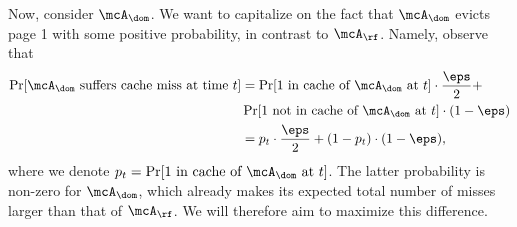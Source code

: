 \documentclass[11pt]{article}
\begin{document}
Now, consider $\mcA_{\dom}$. We want to capitalize on the fact that $\mcA_\dom$ evicts page 1 with some positive probability, in contrast to $\mcA_\rf$. Namely, observe that 
\begin{align}
    \Pr[\text{$\mcA_\dom$ suffers cache miss at time $t$}] &= \Pr[\text{$1$ in cache of $\mcA_\dom$ at $t$}] \cdot \frac{\eps}{2} + \nonumber\\
    & \Pr[\text{$1$ not in cache of $\mcA_\dom$ at $t$}] \cdot (1-\eps) \nonumber \\
    &= p_t \cdot \frac{\eps}{2} + (1-p_t) \cdot (1-\eps), \label{eqn:misses-A-dom}
\end{align}
where we denote $p_t = \Pr[\text{$1$ in cache of $\mcA_\dom$ at $t$}]$. The latter probability is non-zero for $\mcA_\dom$, which already makes its expected total number of misses larger than that of $\mcA_\rf$. We will therefore aim to maximize this difference.
\end{document}

